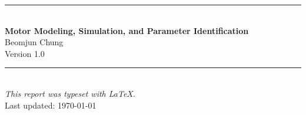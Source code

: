 \thispagestyle{empty}
\clearpage
\vspace*{\fill}

\begin{center}
  \textcolor{accentColor}{\rule{0.4\linewidth}{2pt}}\\[2em]

  {\LARGE\bfseries\color{accentColor} Motor Modeling, Simulation, and Parameter Identification}\\[0.6em]
  {\large\color{gray} Beomjun Chung}\\[0.4em]
  {\normalsize\color{gray} Version 1.0}\\[2em]

  \textcolor{accentColor}{\rule{0.4\linewidth}{2pt}}\\[2em]

  {\small\color{gray} \textit{This report was typeset with \LaTeX.}}\\[0.6em]
  {\small\color{gray} Last updated: \today}
\end{center}

\vspace*{\fill}